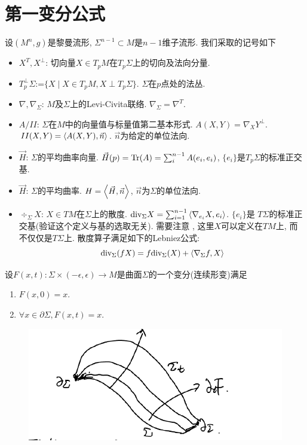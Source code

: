 \section{第一变分公式}
设$(M^n,g)$是黎曼流形, $\Sigma^{n-1}\subset M$是$n-1$维子流形. 我们采取的记号如下
\begin{itemize}
    \item $X^T,X^\perp$: 切向量$X \in T_pM$在$T_p\Sigma$上的切向及法向分量.
    \item $T_p^\perp \Sigma$:=$\{X\mid X\in T_pM, X\perp T_p\Sigma\}$. $\Sigma$在$p$点处的法丛.
    \item $\nabla,\nabla_\Sigma$: $M$及$\Sigma$上的Levi-Civita联络. $\nabla_\Sigma=\nabla^{T}$.
    \item $A/II$: $\Sigma$在$M$中的向量值与标量值第二基本形式. $A(X,Y)=\nabla_XY^\perp$. $II(X,Y)={\left < A(X,Y), \vec{n} \right >}$. $\vec{n}$为给定的单位法向.
    \item $\vec{H}$: $\Sigma$的平均曲率向量. $\vec{H}(p)=\text{Tr}(A)=\sum_{i}^{n-1}A(e_i,e_i)$, $\{e_i\}$是$T_p\Sigma$的标准正交基.
    \item $\vec{H}$: $\Sigma$的平均曲率. $H={\left < \vec{H}, \vec{n} \right >}$, $\vec{n}$为$\Sigma$的单位法向.
    \item $\div_\Sigma X$: $X \in TM$在$\Sigma$上的散度. ${\text{div}}_\Sigma X=\sum_{i=1}^{n-1}{\left < \nabla_{e_i}X, e_i \right >}$. $\{e_i\}$是 $T\Sigma$的标准正交基(验证这个定义与基的选取无关). 需要注意 , 这里$X$可以定义在$TM$上, 而不仅仅是$T\Sigma$上. 散度算子满足如下的Lebniez公式:
    \begin{equation}
        {\text{div}}_\Sigma(fX)=f{\text{div}}_\Sigma(X)+{\left < \nabla_\Sigma f, X \right >}
    \end{equation}
\end{itemize}
设$F(x,t): \Sigma \times (-\epsilon, \epsilon) \to M$是曲面$\Sigma$的一个变分(连续形变)满足
\begin{enumerate}
    \item $F(x,0)=x$.
    \item $\forall x \in \partial \Sigma, F(x,t)=x$.
\end{enumerate}

\begin{figure}[h]
	\centering
	\includegraphics[scale=0.5]{images/variation.png}
	\caption{}
	\label{variation_p}
\end{figure}


